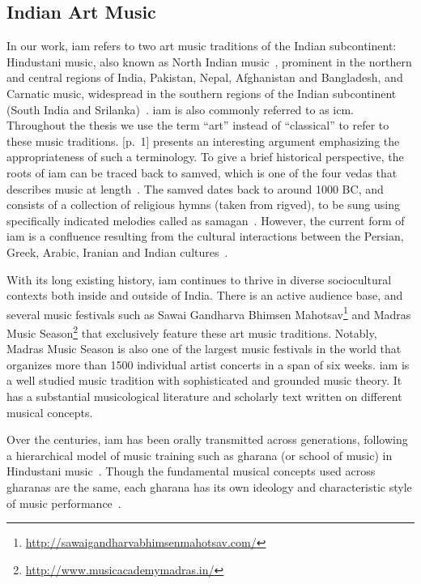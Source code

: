 \subsection{Indian Art Music}
\label{sec:music_background_iam}

In our work, \acrfull{iam} refers to two art music traditions of the Indian subcontinent: Hindustani music, also known as North Indian music~\citep{Bor2010, Danielou2010}, prominent in the northern and central regions of India, Pakistan, Nepal, Afghanistan and Bangladesh, and Carnatic music, widespread in the southern regions of the Indian subcontinent (South India and Srilanka)~\citep{Viswanathan2004,Singh1995}. \gls{iam} is also commonly referred to as \gls{icm}. Throughout the thesis we use the term ``art'' instead of ``classical'' to refer to these music traditions. \cite{Raja2012}[p.~1] presents an interesting argument emphasizing the appropriateness of such a terminology. To give a brief historical perspective, the roots of \gls{iam} can be traced back to \gls{samved}, which is one of the four \gls{vedas} that describes music at length~\citep{Trivedi2008,Singh1995}. The \gls{samved} dates back to around 1000 BC, and consists of a collection of religious hymns (taken from \gls{rigved}), to be sung using specifically indicated melodies called as \gls{samagan}~\citep{Griffith2004}. However, the current form of \gls{iam} is a confluence resulting from the cultural interactions between the Persian, Greek, Arabic, Iranian and Indian cultures~\citep{Kaul2007,Saraf2011,Singh1995}.

With its long existing history, \gls{iam} continues to thrive in diverse sociocultural contexts both inside and outside of India. There is an active audience base, and several music festivals such as Sawai Gandharva Bhimsen Mahotsav\footnote{\url{http://sawaigandharvabhimsenmahotsav.com/}} and Madras Music Season\footnote{\url{http://www.musicacademymadras.in/}} that exclusively feature these art music traditions. Notably, Madras Music Season is also one of the largest music festivals in the world that organizes more than 1500 individual artist concerts in a span of six weeks. \Gls{iam} is a well studied music tradition with sophisticated and grounded music theory. It has a substantial musicological literature and scholarly text written on different musical concepts. 

Over the centuries, \gls{iam} has been orally transmitted across generations, following a hierarchical model of music training such as \gls{gharana} (or school of music) in Hindustani music~\citep{Saraf2011,Mehta2008}. Though the fundamental musical concepts used across \glspl{gharana} are the same, each \gls{gharana} has its own ideology and characteristic style of music performance~\citep{Deshpande1989}. 

